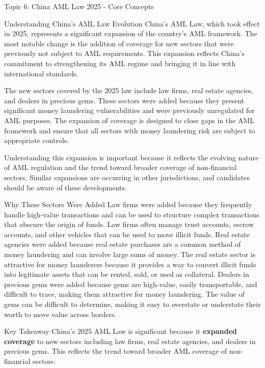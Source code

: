 \documentclass[5pt]{beamer}
\begin{document}
	\begin{frame}{Topic 6: China AML Law 2025 - Core Concepts}
		\begin{block}{\tiny Understanding China's AML Law Evolution}
			\tiny China's AML Law, which took effect in 2025, represents a significant expansion of the country's AML framework. The most notable change is the addition of coverage for new sectors that were previously not subject to AML requirements. This expansion reflects China's commitment to strengthening its AML regime and bringing it in line with international standards.
			
			The new sectors covered by the 2025 law include law firms, real estate agencies, and dealers in precious gems. These sectors were added because they present significant money laundering vulnerabilities and were previously unregulated for AML purposes. The expansion of coverage is designed to close gaps in the AML framework and ensure that all sectors with money laundering risk are subject to appropriate controls.
			
			Understanding this expansion is important because it reflects the evolving nature of AML regulation and the trend toward broader coverage of non-financial sectors. Similar expansions are occurring in other jurisdictions, and candidates should be aware of these developments.
		\end{block}
		
		\begin{block}{\tiny Why These Sectors Were Added}
			\tiny Law firms were added because they frequently handle high-value transactions and can be used to structure complex transactions that obscure the origin of funds. Law firms often manage trust accounts, escrow accounts, and other vehicles that can be used to move illicit funds. Real estate agencies were added because real estate purchases are a common method of money laundering and can involve large sums of money. The real estate sector is attractive for money launderers because it provides a way to convert illicit funds into legitimate assets that can be rented, sold, or used as collateral. Dealers in precious gems were added because gems are high-value, easily transportable, and difficult to trace, making them attractive for money laundering. The value of gems can be difficult to determine, making it easy to overstate or understate their worth to move value across borders.
		\end{block}
		
		\begin{alertblock}{Key Takeaway}
			\tiny China's 2025 AML Law is significant because it \textbf{expanded coverage} to new sectors including law firms, real estate agencies, and dealers in precious gems. This reflects the trend toward broader AML coverage of non-financial sectors.
		\end{alertblock}
	\end{frame}
	
\end{document}
